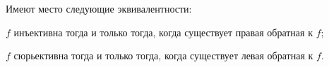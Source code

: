 Имеют место следующие эквивалентности:
\begin{enumcyr}
    \item $f$ инъективна тогда и только тогда, когда существует правая обратная к $f$;
    \item $f$ сюрьективна тогда и только тогда, когда существует левая обратная к $f$.
\end{enumcyr}
